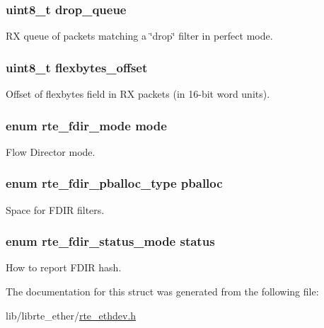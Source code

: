 \subsubsection[{drop\+\_\+queue}]{\setlength{\rightskip}{0pt plus 5cm}uint8\+\_\+t drop\+\_\+queue}\label{structrte__fdir__conf_a23a38b9406dcbda7a8c54adb0cb29b77}
R\+X queue of packets matching a \char`\"{}drop\char`\"{} filter in perfect mode. \hypertarget{structrte__fdir__conf_ad44e0922f241056e54de2b94d1f5d9b3}{}
\subsubsection[{flexbytes\+\_\+offset}]{\setlength{\rightskip}{0pt plus 5cm}uint8\+\_\+t flexbytes\+\_\+offset}\label{structrte__fdir__conf_ad44e0922f241056e54de2b94d1f5d9b3}
Offset of flexbytes field in R\+X packets (in 16-\/bit word units). \hypertarget{structrte__fdir__conf_ac232664a75e2d52a9bec4235b0896046}{}
\subsubsection[{mode}]{\setlength{\rightskip}{0pt plus 5cm}enum {\bf rte\+\_\+fdir\+\_\+mode} mode}\label{structrte__fdir__conf_ac232664a75e2d52a9bec4235b0896046}
Flow Director mode. \hypertarget{structrte__fdir__conf_a7fb17234fd998f8a09757542754e3ec7}{}
\subsubsection[{pballoc}]{\setlength{\rightskip}{0pt plus 5cm}enum {\bf rte\+\_\+fdir\+\_\+pballoc\+\_\+type} pballoc}\label{structrte__fdir__conf_a7fb17234fd998f8a09757542754e3ec7}
Space for F\+D\+I\+R filters. \hypertarget{structrte__fdir__conf_a6d21f48c75d50917d0b737473df8b067}{}
\subsubsection[{status}]{\setlength{\rightskip}{0pt plus 5cm}enum {\bf rte\+\_\+fdir\+\_\+status\+\_\+mode} status}\label{structrte__fdir__conf_a6d21f48c75d50917d0b737473df8b067}
How to report F\+D\+I\+R hash. 

The documentation for this struct was generated from the following file\+:\begin{DoxyCompactItemize}
\item 
lib/librte\+\_\+ether/\hyperlink{rte__ethdev_8h}{rte\+\_\+ethdev.\+h}\end{DoxyCompactItemize}
